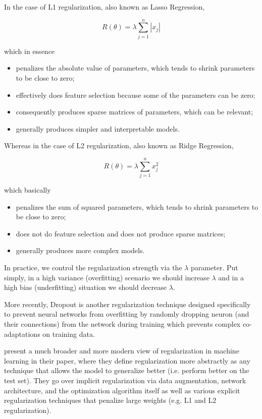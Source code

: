 In the case of L1 regularization, also known as Lasso Regression,

$$
R(\theta) = \lambda \sum_{j=1}^{n} |x_j|
$$

which in essence

\begin{itemize}
    \item penalizes the absolute value of parameters, which tends to shrink parameters to be close to zero;
    \item effectively does feature selection because some of the parameters can be zero;
    \item consequently produces sparse matrices of parameters, which can be relevant;
    \item generally produces simpler and interpretable models.
\end{itemize}

Whereas in the case of L2 regularization, also known as Ridge Regression,

$$
R(\theta) = \lambda \sum_{j=1}^{n} x_j^2
$$

which basically

\begin{itemize}
    \item penalizes the sum of squared parameters, which tends to shrink parameters to be close to zero;
    \item does not do feature selection and does not produce sparse matrices;
    \item generally produces more complex models.
\end{itemize}

In practice, we control the regularization strength via the $\lambda$ parameter. Put simply, in a high variance (overfitting) scenario we should increase $\lambda$ and in a high bias (underfitting) situation we should decrease $\lambda$.

More recently, Dropout\cite{dropout} is another regularization technique designed specifically to prevent neural networks from overfitting by randomly dropping neuron (and their connections) from the network during training which prevents complex co-adaptations on training data.

\citeauthor{regularizationsurvey} present a much broader and more modern view of regularization in machine learning in their \citeyear{regularizationsurvey} paper\cite{regularizationsurvey}, where they define regularization more abstractly as any technique that allows the model to generalize better (i.e. perform better on the test set). They go over implicit regularization via data augmentation, network architecture, and the optimization algorithm itself as well as various explicit regularization techniques that penalize large weights (e.g. L1 and L2 regularization).

